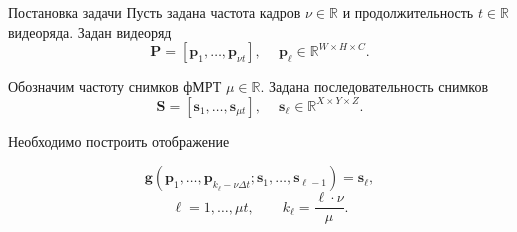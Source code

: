 \documentclass{beamer}
\begin{document}
\begin{frame}{Постановка задачи}
    Пусть задана частота кадров $\nu \in \mathbb{R}$ и продолжительность $t \in \mathbb{R}$ видеоряда. 
	Задан видеоряд
	\begin{equation*}
		\label{eq1}
		\mathbf{P} = [\mathbf{p}_1, \ldots, \mathbf{p}_{\nu t}], \quad\
		\mathbf{p}_{\ell} \in \mathbb{R}^{W \times H \times C}.
	\end{equation*}

	Обозначим частоту снимков фМРТ $\mu \in \mathbb{R}$. Задана последовательность снимков 
	\begin{equation*}
		\label{eq2}
		\mathbf{S} = [\mathbf{s}_1, \ldots, \mathbf{s}_{\mu t}], \quad\
		\mathbf{s}_{\ell} \in \mathbb{R}^{X \times Y \times Z}.
	\end{equation*}

	Необходимо построить отображение
    \begin{block}{}
        \begin{equation*}
            \label{eq3}
            \mathbf{g}(\mathbf{p}_1, \ldots, \mathbf{p}_{k_{\ell} - \nu \Delta t}; \mathbf{s}_1, \ldots, \mathbf{s}_{\ell-1}) = \mathbf{s}_{\ell},
        \end{equation*}
        \begin{equation*}
            \label{eq4}
            \ell = 1, \ldots, \mu t, \qquad k_{\ell} = \dfrac{\ell \cdot \nu}{\mu}.
        \end{equation*}
    \end{block}
\end{frame}
\end{document}
